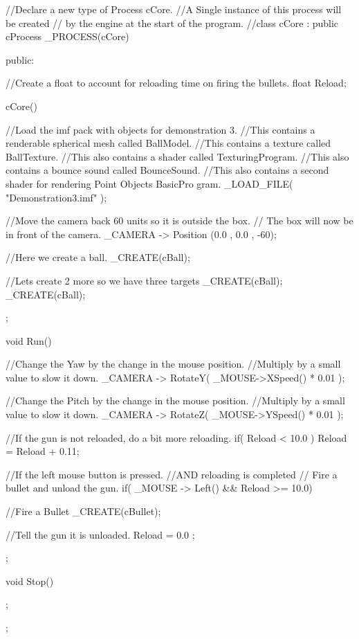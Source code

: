 \begin{DoxyCode}
//Declare a new type of Process cCore.
//A Single instance of this process will be created
// by the engine at the start of the program.
//class cCore : public cProcess
_PROCESS(cCore)
{
public:

        //Create a float to account for reloading time on firing the bullets.
        float Reload;

        cCore()
        {
        //Load the imf pack with objects for demonstration 3.
        //This contains a renderable spherical mesh called BallModel.
        //This contains a texture called BallTexture.
        //This also contains a shader called TexturingProgram.
        //This also contains a bounce sound called BounceSound.
        //This also contains a second shader for rendering Point Objects BasicPro
      gram.
                _LOAD_FILE( "Demonstration3.imf" );

        //Move the camera back 60 units so it is outside the box.
        // The box will now be in front of the camera.
                _CAMERA -> Position (0.0 , 0.0 , -60);

        //Here we create a ball.
                _CREATE(cBall);

        //Lets create 2 more so we have three targets
                _CREATE(cBall);
                _CREATE(cBall);

        };

        void Run()
        {
                //Change the Yaw by the change in the mouse position.
                //Multiply by a small value to slow it down.
                        _CAMERA -> RotateY( _MOUSE->XSpeed() * 0.01 );

                //Change the Pitch by the change in the mouse position.
                //Multiply by a small value to slow it down.
                        _CAMERA -> RotateZ( _MOUSE->YSpeed() * 0.01 );

                //If the gun is not reloaded, do a bit more reloading.
                        if( Reload < 10.0 ) { Reload = Reload + 0.11; }

                //If the left mouse button is pressed.
                //AND reloading is completed
                // Fire a bullet and unload the gun.
                if( _MOUSE -> Left() && Reload >= 10.0)
                {
                        //Fire a Bullet
                                _CREATE(cBullet);

                        //Tell the gun it is unloaded.
                                Reload = 0.0 ;
                }
        };

        void Stop()
        {

        };


 };
\end{DoxyCode}
